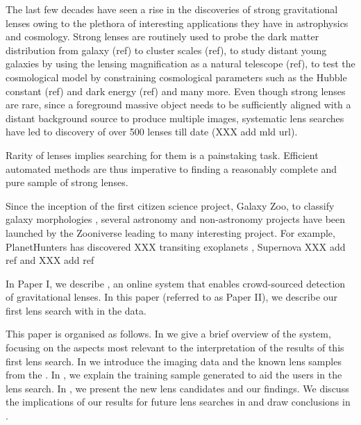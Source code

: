 \documentclass[useAMS,usenatbib,a4paper]{mn2e}
\begin{document}

The last few decades have seen a rise in the discoveries of strong
gravitational lenses owing to the plethora of interesting applications
they have in astrophysics and cosmology. Strong lenses are routinely
used to probe the dark matter distribution from galaxy (ref) to cluster
scales (ref), to  study distant young galaxies by using the lensing
magnification as a natural telescope (ref), to test the cosmological
model by constraining cosmological parameters such as the Hubble
constant (ref) and dark energy (ref) and many more. Even though strong
lenses are rare, since a foreground massive object needs to be
sufficiently aligned with a distant background source to produce
multiple images, systematic lens searches have led to discovery of over
500 lenses till date (XXX add mld url). 

Rarity of lenses implies searching for them is a painstaking task.
Efficient automated methods are thus imperative to finding a reasonably
complete and pure sample of strong lenses.   



Since the inception of the first citizen science project, Galaxy Zoo, to
classify galaxy morphologies \citep{Lintott2008}, several astronomy
and non-astronomy projects have been launched by the Zooniverse leading
to many interesting project. For example, PlanetHunters
has discovered XXX transiting exoplanets \citep{Schwamb2012},
Supernova XXX add ref and XXX add ref


In Paper I, we describe \sw, an online system that enables crowd-sourced
detection of gravitational lenses. In this paper (referred to as Paper
II), we describe our first lens search with \sw in the \cfhtls data.

This paper is organised as follows. In  we give a brief
overview of the \sw system, focusing on the aspects most relevant to the
interpretation of the results of this first lens search. In
 we introduce the \cfhtls imaging data and the known lens
samples from the \cfhtls. In , we explain the training sample
generated to aid the \sw users in the lens search. In
, we present the new lens candidates and our findings.
We discuss the implications of our results for future lens searches in
 and draw conclusions in .
\end{document}
